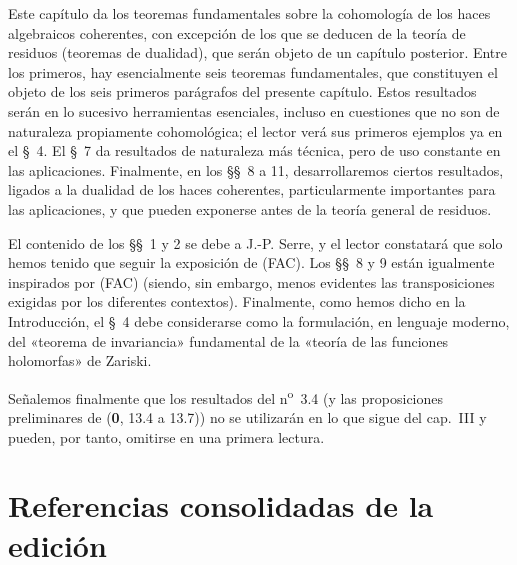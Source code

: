 \medskip
Este capítulo da los teoremas fundamentales sobre la cohomología de los haces algebraicos coherentes, con excepción de los que se deducen de la teoría de residuos (teoremas de dualidad), que serán objeto de un capítulo posterior. Entre los primeros, hay esencialmente seis teoremas fundamentales, que constituyen el objeto de los seis primeros parágrafos del presente capítulo. Estos resultados serán en lo sucesivo herramientas esenciales, incluso en cuestiones que no son de naturaleza propiamente cohomológica; el lector verá sus primeros ejemplos ya en el \S~4. El \S~7 da resultados de naturaleza más técnica, pero de uso constante en las aplicaciones. Finalmente, en los \S\S~8 a 11, desarrollaremos ciertos resultados, ligados a la dualidad de los haces coherentes, particularmente importantes para las aplicaciones, y que pueden exponerse antes de la teoría general de residuos.


El contenido de los \S\S~1 y 2 se debe a J.-P. Serre, y el lector constatará que solo hemos tenido que seguir la exposición de (FAC). Los \S\S~8 y 9 están igualmente inspirados por (FAC) (siendo, sin embargo, menos evidentes las transposiciones exigidas por los diferentes contextos). Finalmente, como hemos dicho en la Introducción, el \S~4 debe considerarse como la formulación, en lenguaje moderno, del «teorema de invariancia» fundamental de la «teoría de las funciones holomorfas» de Zariski.

Señalemos finalmente que los resultados del n\textsuperscript{o}~3.4 (y las proposiciones preliminares de (\textbf{0}, 13.4 a 13.7)) no se utilizarán en lo que sigue del cap.~III y pueden, por tanto, omitirse en una primera lectura.

\setcounter{section}{0}







\clearpage
{}
{}
\section*{Referencias consolidadas de la edición}




